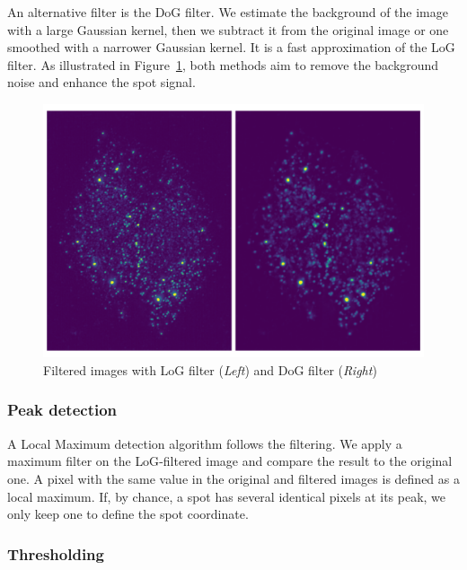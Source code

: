 An alternative filter is the \ac{DoG} filter.
We estimate the background of the image with a large Gaussian kernel, then we subtract it from the original image or one smoothed with a narrower Gaussian kernel.
It is a fast approximation of the \ac{LoG} filter.
As illustrated in Figure~\ref{fig:filters_detection}, both methods aim to remove the background noise and enhance the spot signal.


\begin{figure}[h]
    \centering
    \includegraphics[width=1\textwidth]{figures/chapter2/filter_background}
    \caption{Filtered images with LoG filter (\textit{Left}) and DoG filter (\textit{Right})}
    \label{fig:filters_detection}
\end{figure}

\subsubsection{Peak detection}

A Local Maximum detection algorithm follows the filtering.
We apply a maximum filter on the \ac{LoG}-filtered image and compare the result to the original one.
A pixel with the same value in the original and filtered images is defined as a local maximum.
If, by chance, a spot has several identical pixels at its peak, we only keep one to define the spot coordinate.


\subsubsection{Thresholding}

